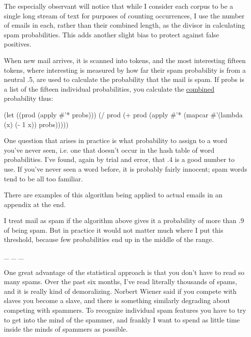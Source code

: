 The
                    especially observant will notice that while I consider each
                    corpus to be a single long stream of text for purposes of
                    counting occurrences, I use the number of emails in each,
                    rather than their combined length, as the divisor in
                    calculating spam probabilities. This adds another slight
                    bias to protect against false positives.

When new
                    mail arrives, it is scanned into tokens, and the most
                    interesting fifteen tokens, where interesting is measured by
                    how far their spam probability is from a neutral .5, are
                    used to calculate the probability that the mail is spam. If
                    probs
                    is a list of the fifteen individual probabilities, you
                    calculate the
                    \href{http://www.paulgraham.com/naivebayes.html}{combined} probability thus:
                    
                      
(let ((prod (apply \#'* probs)))
  (/ prod (+ prod (apply \#'* (mapcar \#'(lambda (x) 
                                         (- 1 x))
                                     probs)))))

                    
                    One question that arises in practice is what probability to
                    assign to a word you've never seen, i.e. one that doesn't
                    occur in the hash table of word probabilities. I've found,
                    again by trial and error, that .4 is a good number to use.
                    If you've never seen a word before, it is probably fairly
                    innocent; spam words tend to be all too familiar.

There
                    are examples of this algorithm being applied to actual
                    emails in an appendix at the end.

I treat mail as
                    spam if the algorithm above gives it a probability of more
                    than .9 of being spam. But in practice it would not matter
                    much where I put this threshold, because few probabilities
                    end up in the middle of the range.


                    \_ \_ \_
                    

One great advantage of the statistical approach
                    is that you don't have to read so many spams. Over the past
                    six months, I've read literally thousands of spams, and it
                    is really kind of demoralizing. Norbert Wiener said if you
                    compete with slaves you become a slave, and there is
                    something similarly degrading about competing with spammers.
                    To recognize individual spam features you have to try to get
                    into the mind of the spammer, and frankly I want to spend as
                    little time inside the minds of spammers as possible.


